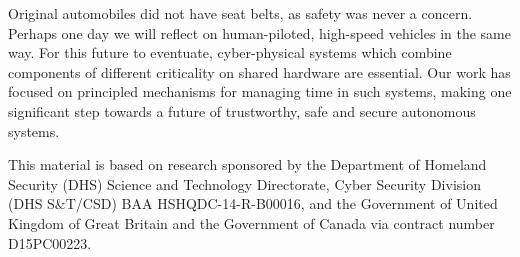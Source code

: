 Original automobiles did not have seat belts, as safety was never a concern. Perhaps one day we
will reflect on human-piloted, high-speed vehicles in the same way. For this future to eventuate, 
cyber-physical systems which combine components of different criticality on shared hardware are essential.
Our work has focused on principled mechanisms for managing time in such systems,
making one significant step towards a future of trustworthy,
safe and secure autonomous systems.

\bigskip
This material is based on research sponsored by the Department of Homeland Security (DHS) Science
and Technology Directorate, Cyber Security Division (DHS S\&T/CSD) BAA HSHQDC-14-R-B00016, and the
Government of United Kingdom of Great Britain and the Government of Canada via contract number
D15PC00223. 

